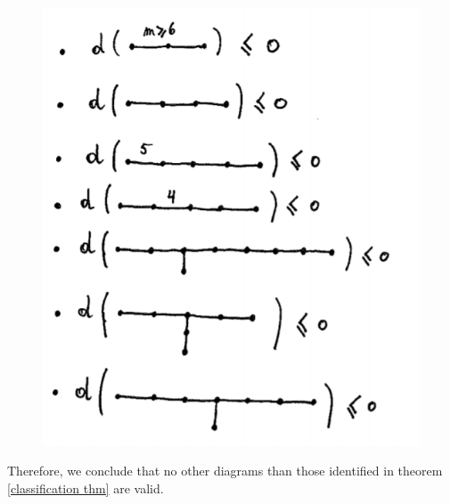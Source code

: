 \begin{itemize}
\begin{figure}[h!]
\centering
\includegraphics[scale=0.6]{cours9fig7.png}
\caption{}
\label{cours9fig7}
\end{figure}

Therefore, we conclude that no other diagrams than those identified in theorem \ref{classification thm} are valid.

\end{itemize}
